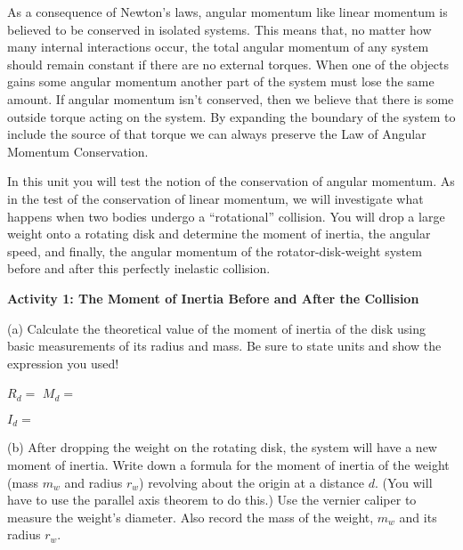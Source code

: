 As a consequence of Newton's laws, angular momentum like linear momentum is
believed to be conserved in isolated systems. This means that, no matter how
many internal interactions occur, the total angular momentum of any system should remain constant if there are no external torques. When one of the objects gains some angular momentum another part of the system must lose the same amount. If angular momentum isn't conserved, then we believe that there is some outside torque acting on the system. By expanding the boundary of the system to include the source of that torque we can always preserve the Law of Angular Momentum Conservation. 

In this unit you will test the notion of the conservation of angular momentum.
As in the test of the conservation of linear momentum, we will investigate what
happens when two bodies undergo a ``rotational'' collision.
You will drop a large weight onto a rotating disk and determine the moment of
inertia, the angular speed, and finally, the angular momentum of the rotator-disk-weight
system before and after this perfectly inelastic collision.

\textbf{Activity 1: The Moment of Inertia Before and After the Collision}

(a) Calculate the theoretical value of the moment of inertia of the disk
using basic measurements of its radius and mass. Be sure to state units and
show the expression you used!
\vspace{5mm}

\( R_{d} =\)  \hfill{}\( M_{d}= \) \hfill{}
\vspace{5mm}

\( I_{d}= \)
\vspace{5mm}

(b) After dropping the weight on the rotating disk, the system will have a new
moment of inertia. Write down a formula for the moment of inertia of the weight 
(mass $m_w$ and radius $r_w$) revolving about the origin at a distance $d$. 
(You will have to use the parallel axis theorem to do this.)
Use the vernier caliper to measure the weight's diameter.
Also record the mass of the weight, $m_w$ and its radius $r_w$.
\vspace{3mm}

